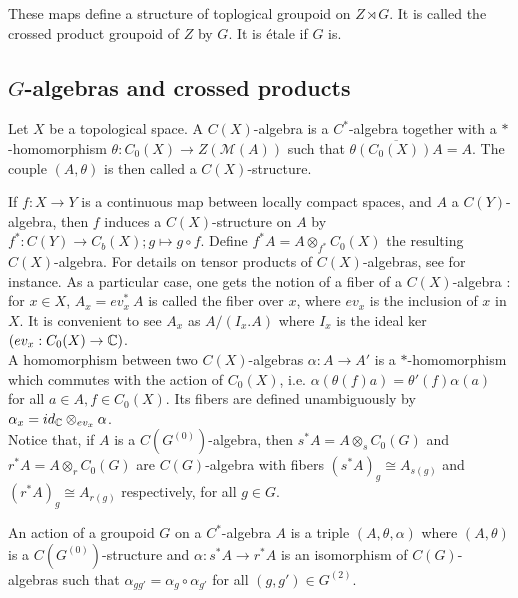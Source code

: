These maps define a structure of toplogical groupoid on $Z\rtimes G$. It is called the crossed product groupoid of $Z$ by $G$. It is étale if $G$ is.\\

\subsection{$G$-algebras and crossed products}

\begin{definition}
Let $X$ be a topological space. A $C(X)$-algebra is a $C^*$-algebra together with a $*$-homomorphism $\theta : C_0(X)\rightarrow Z(\mathcal M(A))$ such that $\overline{\theta (C_0(X)) A} = A$. The couple $(A,\theta)$ is then called a $C(X)$-structure.
\end{definition} 

If $f : X\rightarrow Y$ is a continuous map between locally compact spaces, and $A$ a $C(Y)$-algebra, then $f$ induces a $C(X)$-structure on $A$ by $f^* : C(Y) \rightarrow C_b(X); g\mapsto g\circ f$. Define $f^* A = A \otimes_{f^*} C_0(X)$ the resulting $C(X)$-algebra. For details on tensor products of $C(X)$-algebras, see \cite{LeGall} for instance. As a particular case, one gets the notion of a fiber of a $C(X)$-algebra : for $x\in X$, $A_x = ev_x^* \ A$ is called the fiber over $x$, where $ev_x$ is the inclusion of $x$ in $X$. It is convenient to see $A_x$ as $A/ (I_x .A)$ where $I_x$ is the ideal ker $(ev_x : C_0(X) \rightarrow \mathbb C)$.\\

A homomorphism between two $C(X)$-algebras $\alpha : A\rightarrow A'$ is a $*$-homomorphism which commutes with the action of $C_0(X)$, i.e. $\alpha(\theta(f)a)=\theta'(f)\alpha(a)$ for all $a\in A,f\in C_0(X)$. Its fibers are defined unambiguously by $\alpha_x = id_\mathbb C \otimes_{ev_x} \alpha$.\\

Notice that, if $A$ is a $C(G^{(0)})$-algebra, then $s^* A = A \otimes_s C_0(G)$ and $r^* A = A \otimes_r C_0(G)$ are $C(G)$-algebra with fibers $(s^*A)_g \cong A_{s(g)}$ and $(r^*A)_g \cong A_{r(g)}$ respectively, for all $g\in G$.

\begin{definition}
An action of a groupoid $G$ on a $C^*$-algebra $A$ is a triple $(A,\theta,\alpha)$ where $(A,\theta)$ is a $C(G^{(0)})$-structure and $\alpha : s^* A \rightarrow r^* A$ is an isomorphism of $C(G)$-algebras such that $\alpha_{gg'}= \alpha_g\circ \alpha_{g'}$ for all $(g,g')\in G^{(2)}$.
\end{definition} 

